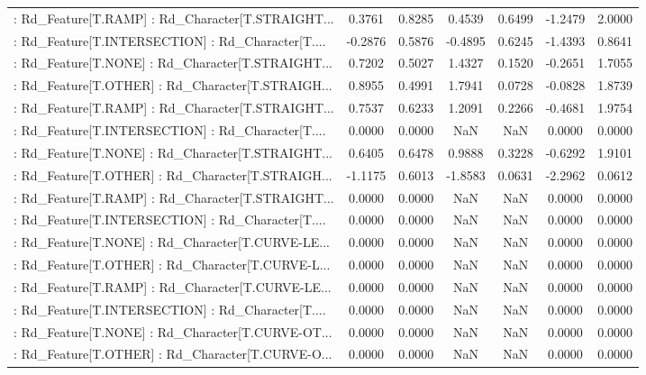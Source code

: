 \begin{longtable}{p{4cm}cccccc}
 : Rd\_Feature[T.RAMP] : Rd\_Character[T.STRAIGHT... &  0.3761 &    0.8285 &  0.4539 &       0.6499 & -1.2479 &  2.0000 \\
 : Rd\_Feature[T.INTERSECTION] : Rd\_Character[T.... & -0.2876 &    0.5876 & -0.4895 &       0.6245 & -1.4393 &  0.8641 \\
 : Rd\_Feature[T.NONE] : Rd\_Character[T.STRAIGHT... &  0.7202 &    0.5027 &  1.4327 &       0.1520 & -0.2651 &  1.7055 \\
 : Rd\_Feature[T.OTHER] : Rd\_Character[T.STRAIGH... &  0.8955 &    0.4991 &  1.7941 &       0.0728 & -0.0828 &  1.8739 \\
 : Rd\_Feature[T.RAMP] : Rd\_Character[T.STRAIGHT... &  0.7537 &    0.6233 &  1.2091 &       0.2266 & -0.4681 &  1.9754 \\
 : Rd\_Feature[T.INTERSECTION] : Rd\_Character[T.... &  0.0000 &    0.0000 &     NaN &          NaN &  0.0000 &  0.0000 \\
 : Rd\_Feature[T.NONE] : Rd\_Character[T.STRAIGHT... &  0.6405 &    0.6478 &  0.9888 &       0.3228 & -0.6292 &  1.9101 \\
 : Rd\_Feature[T.OTHER] : Rd\_Character[T.STRAIGH... & -1.1175 &    0.6013 & -1.8583 &       0.0631 & -2.2962 &  0.0612 \\
 : Rd\_Feature[T.RAMP] : Rd\_Character[T.STRAIGHT... &  0.0000 &    0.0000 &     NaN &          NaN &  0.0000 &  0.0000 \\
 : Rd\_Feature[T.INTERSECTION] : Rd\_Character[T.... &  0.0000 &    0.0000 &     NaN &          NaN &  0.0000 &  0.0000 \\
 : Rd\_Feature[T.NONE] : Rd\_Character[T.CURVE-LE... &  0.0000 &    0.0000 &     NaN &          NaN &  0.0000 &  0.0000 \\
 : Rd\_Feature[T.OTHER] : Rd\_Character[T.CURVE-L... &  0.0000 &    0.0000 &     NaN &          NaN &  0.0000 &  0.0000 \\
 : Rd\_Feature[T.RAMP] : Rd\_Character[T.CURVE-LE... &  0.0000 &    0.0000 &     NaN &          NaN &  0.0000 &  0.0000 \\
 : Rd\_Feature[T.INTERSECTION] : Rd\_Character[T.... &  0.0000 &    0.0000 &     NaN &          NaN &  0.0000 &  0.0000 \\
 : Rd\_Feature[T.NONE] : Rd\_Character[T.CURVE-OT... &  0.0000 &    0.0000 &     NaN &          NaN &  0.0000 &  0.0000 \\
 : Rd\_Feature[T.OTHER] : Rd\_Character[T.CURVE-O... &  0.0000 &    0.0000 &     NaN &          NaN &  0.0000 &  0.0000 \\

\end{longtable}
